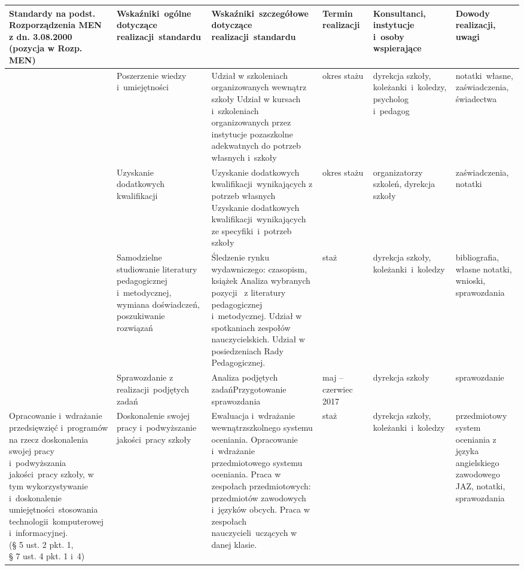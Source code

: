 \documentclass[a4paper,titlepage,13pt,draft]{mwart}
\begin{document}
\begin{tabular}{ | p{2.4cm} | p{2.5cm} | p{5cm} | p{1.4cm} | p{2cm} | p{2.1cm} |}
\hline
Standardy na podst. Rozporządzenia MEN z dn. 3.08.2000 (pozycja w Rozp. MEN) & Wskaźniki~ogólne dotyczące realizacji~standardu & Wskaźniki~szczegółowe dotyczące realizacji~standardu & Termin realizacji~& Konsultanci, instytucje i~osoby wspierające & Dowody realizacji, uwagi~\\ \hline \hline
&Poszerzenie wiedzy i~umiejętności&Udział w szkoleniach organizowanych wewnątrz szkoły\newline
Udział w kursach i~szkoleniach organizowanych przez instytucje pozaszkolne adekwatnych do potrzeb własnych i~szkoły&okres stażu&dyrekcja szkoły, koleżanki~i~koledzy, psycholog i~pedagog&notatki~własne, zaświadczenia, świadectwa\\ \cline{2-6}
&Uzyskanie dodatkowych kwalifikacji&Uzyskanie dodatkowych kwalifikacji~wynikających z potrzeb własnych\newline
Uzyskanie dodatkowych kwalifikacji~wynikających ze specyfiki~i~potrzeb szkoły&okres stażu&organiza\-to\-rzy szkoleń, dyrekcja szkoły&zaświad\-cze\-nia, notatki\\ \cline{2-6}
&Samodzielne studiowanie literatury pedagogicznej i~metodycznej, wymiana doświadczeń, poszukiwanie rozwiązań&Śledzenie rynku wydawniczego: czasopism, książek\newline
Analiza wybranych pozycji~  z literatury pedagogicznej i~metodycznej.\newline
Udział w spotkaniach zespołów nauczycielskich.\newline
Udział w posiedzeniach Rady Pedagogicznej.\newline
&staż&dyrekcja szkoły, koleżanki~i~koledzy&bibliografia, własne notatki, wnioski, sprawozdania\\ \cline{2-6}
&Sprawozdanie z realizacji~podjętych zadań&Analiza podjętych zadań\newline Przygotowanie sprawozdania&maj -- czerwiec 2017&dyrekcja szkoły&sprawozdanie\\ \hline
\multiline{Opracowanie i~wdrażanie przedsięwzięć i~programów na rzecz doskonalenia swojej pracy i~podwyższania jakości~pracy szkoły, w tym wykorzystywanie i~doskonalenie umiejętności~stosowania technologii~komputerowej i~informacyjnej.\newline
(§ 5 ust. 2 pkt. 1,\newline 
§ 7 ust. 4 pkt. 1 i~4)}
&Doskonalenie swojej pracy i~podwyższanie jakości~pracy szkoły&
Ewaluacja i~wdrażanie wewnątrzszkolnego systemu oceniania.\newline
Opracowanie i~wdrażanie przedmiotowego systemu oceniania.\newline
Praca w zespołach przedmiotowych: przedmiotów zawodowych i~języków obcych.\newline
Praca w zespołach nauczycieli~uczących w danej klasie.
&staż&dyrekcja szkoły, koleżanki~i~koledzy&
przedmiotowy system oceniania z języka angielskiego zawodowego JAZ, notatki, sprawozda\-nia\\ \hline
\end{tabular}
\end{document}
